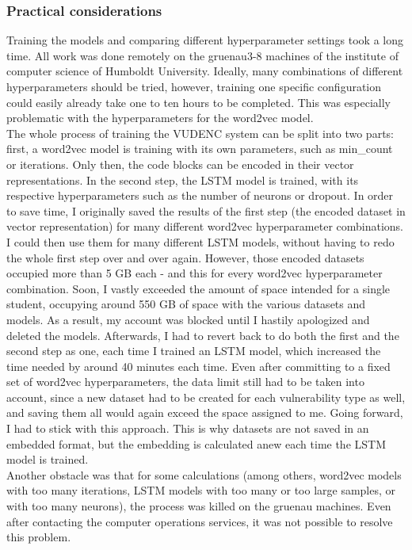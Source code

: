 \documentclass[
a4paper,
pagesize,
pdftex,
12pt,
twoside, %
BCOR=5mm, %
ngerman,
fleqn,
final,
]{scrartcl}
\begin{document}
	\subsubsection{Practical considerations}
	Training the models and comparing different hyperparameter settings took a long time. All work was done remotely on the gruenau3-8 machines of the institute of computer science of Humboldt University. Ideally, many combinations of different hyperparameters should be tried, however, training one specific configuration could easily already take one to ten hours to be completed. This was especially problematic with the hyperparameters for the word2vec model.\\
	The whole process of training the VUDENC system can be split into two parts: first, a word2vec model is training with its own parameters, such as min\_count or iterations. Only then, the code blocks can be encoded in their vector representations. In the second step, the LSTM model is trained, with its respective hyperparameters such as the number of neurons or dropout. In order to save time, I originally saved the results of the first step (the encoded dataset in vector representation) for many different word2vec hyperparameter combinations. I could then use them for many different LSTM models, without having to redo the whole first step over and over again. However, those encoded datasets occupied more than 5 GB each - and this for every word2vec hyperparameter combination. Soon, I vastly exceeded the amount of space intended for a single student, occupying around 550 GB of space with the various datasets and models. As a result, my account was blocked until I hastily apologized and deleted the models. Afterwards, I had to revert back to do both the first and the second step as one, each time I trained an LSTM model, which increased the time needed by around 40 minutes each time. Even after committing to a fixed set of word2vec hyperparameters, the data limit still had to be taken into account, since a new dataset had to be created for each vulnerability type as well, and saving them all would again exceed the space assigned to me. Going forward, I had to stick with this approach. This is why datasets are not saved in an embedded format, but the embedding is calculated anew each time the LSTM model is trained.\\ %
	Another obstacle was that for some calculations (among others, word2vec models with too many iterations, LSTM models with too many or too large samples, or with too many neurons), the process was killed on the gruenau machines. Even after contacting the computer operations services, it was not possible to resolve this problem.\\
\end{document}
